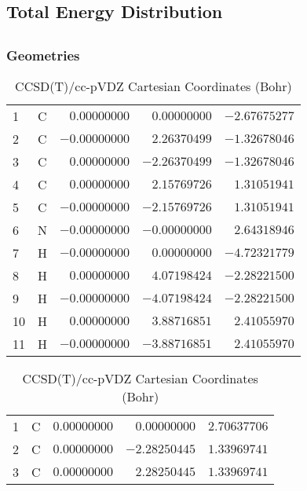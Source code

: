 \documentclass[10pt,oneside]{article}
\begin{document}
\begin{table}
\subsection*{Total Energy Distribution}
\centering\end{table}

\clearpage

\subsection{}

\begin{table}[h!]
\subsubsection*{Geometries}
\begin{multicols}{2}
\centering
\caption{CCSD(T)/cc-pVTZ Cartesian Coordinates (Bohr)}
\begin{tabular}{llrrr}
\toprule
1  & C  & $ 0.00000000$ & $ 0.00000000$ & $-2.67675277$ \\
2  & C  & $-0.00000000$ & $ 2.26370499$ & $-1.32678046$ \\
3  & C  & $ 0.00000000$ & $-2.26370499$ & $-1.32678046$ \\
4  & C  & $ 0.00000000$ & $ 2.15769726$ & $ 1.31051941$ \\
5  & C  & $-0.00000000$ & $-2.15769726$ & $ 1.31051941$ \\
6  & N  & $-0.00000000$ & $-0.00000000$ & $ 2.64318946$ \\
7  & H  & $-0.00000000$ & $ 0.00000000$ & $-4.72321779$ \\
8  & H  & $ 0.00000000$ & $ 4.07198424$ & $-2.28221500$ \\
9  & H  & $-0.00000000$ & $-4.07198424$ & $-2.28221500$ \\
10 & H  & $ 0.00000000$ & $ 3.88716851$ & $ 2.41055970$ \\
11 & H  & $-0.00000000$ & $-3.88716851$ & $ 2.41055970$ \\
\bottomrule
\end{tabular}
\caption{CCSD(T)/cc-pVDZ Cartesian Coordinates (Bohr)}
\begin{tabular}{llrrr}
\toprule
1  & C  & $ 0.00000000$ & $ 0.00000000$ & $ 2.70637706$ \\
2  & C  & $ 0.00000000$ & $-2.28250445$ & $ 1.33969741$ \\
3  & C  & $ 0.00000000$ & $ 2.28250445$ & $ 1.33969741$ \\

\end{tabular}
\end{multicols}
\end{table}
\end{document}
